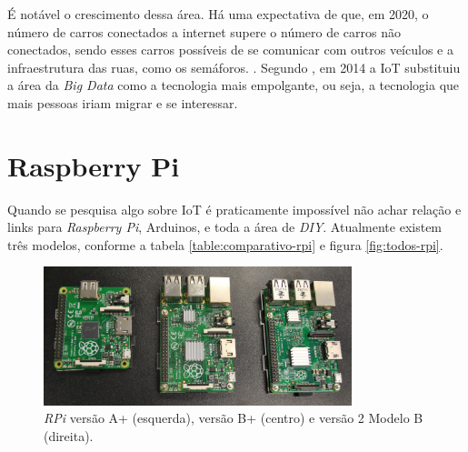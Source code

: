 \documentclass[
		12pt,				%
		openright,			%
		oneside,			%
		a4paper,			%
		chapter=TITLE,		%
		english,			%
		brazil				%
	]{abntex2}
\begin{document}
É notável o crescimento dessa área. Há uma expectativa de que, em 2020, o número de carros conectados a internet supere o número de carros não conectados, sendo esses carros possíveis de se comunicar com outros veículos e a infraestrutura das ruas, como os semáforos. \cite{goldmansachs-iot}. Segundo , em 2014 a IoT substituiu a área da \textit{Big Data} como a tecnologia mais empolgante, ou seja, a tecnologia que mais pessoas iriam migrar e se interessar. 


\section{Raspberry Pi}\label{sec:raspberry-pi}

Quando se pesquisa algo sobre IoT é praticamente impossível não achar relação e links para \textit{Raspberry Pi}, Arduinos, e toda a área de \textit{DIY}. Atualmente existem três modelos, conforme a tabela \autoref{table:comparativo-rpi} e figura \autoref{fig:todos-rpi}. 

\begin{figure}[htb]
	\caption{\label{fig:todos-rpi}\textit{RPi} versão A+ (esquerda), versão B+ (centro) e versão 2 Modelo B (direita).}
	\begin{center}
		\includegraphics[width=0.8\textwidth]{img/rpi-modelos.jpg}
	\end{center}
\end{figure}

\begin{table}[htb]
\end{table}
\end{document}
